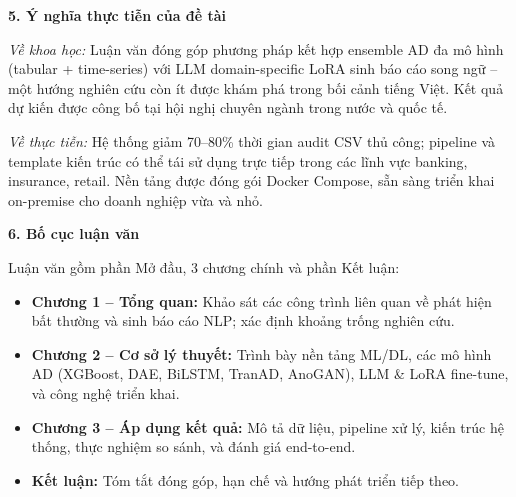 \medskip
\noindent\textbf{5. Ý nghĩa thực tiễn của đề tài}

\textit{Về khoa học:} Luận văn đóng góp phương pháp kết hợp ensemble AD đa mô hình (tabular + time-series) với LLM domain-specific LoRA sinh báo cáo song ngữ -- một hướng nghiên cứu còn ít được khám phá trong bối cảnh tiếng Việt. Kết quả dự kiến được công bố tại hội nghị chuyên ngành trong nước và quốc tế.

\textit{Về thực tiễn:} Hệ thống giảm 70--80\% thời gian audit CSV thủ công; pipeline và template kiến trúc có thể tái sử dụng trực tiếp trong các lĩnh vực banking, insurance, retail. Nền tảng được đóng gói Docker Compose, sẵn sàng triển khai on-premise cho doanh nghiệp vừa và nhỏ.

\medskip
\noindent\textbf{6. Bố cục luận văn}

Luận văn gồm phần Mở đầu, 3 chương chính và phần Kết luận:
\begin{itemize}
  \item \textbf{Chương 1 -- Tổng quan:} Khảo sát các công trình liên quan về phát hiện bất thường và sinh báo cáo NLP; xác định khoảng trống nghiên cứu.
  \item \textbf{Chương 2 -- Cơ sở lý thuyết:} Trình bày nền tảng ML/DL, các mô hình AD (XGBoost, DAE, BiLSTM, TranAD, AnoGAN), LLM \& LoRA fine-tune, và công nghệ triển khai.
  \item \textbf{Chương 3 -- Áp dụng kết quả:} Mô tả dữ liệu, pipeline xử lý, kiến trúc hệ thống, thực nghiệm so sánh, và đánh giá end-to-end.
  \item \textbf{Kết luận:} Tóm tắt đóng góp, hạn chế và hướng phát triển tiếp theo.
\end{itemize}
